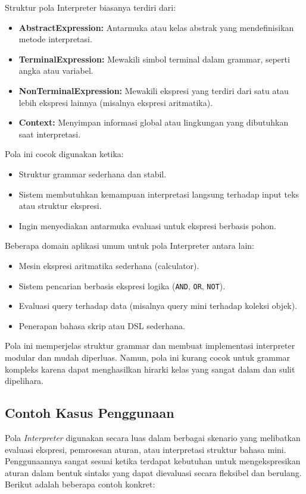 Struktur pola Interpreter biasanya terdiri dari:
\begin{itemize}
	\item \textbf{AbstractExpression:} Antarmuka atau kelas abstrak yang mendefinisikan metode interpretasi.
	\item \textbf{TerminalExpression:} Mewakili simbol terminal dalam grammar, seperti angka atau variabel.
	\item \textbf{NonTerminalExpression:} Mewakili ekspresi yang terdiri dari satu atau lebih ekspresi lainnya (misalnya ekspresi aritmatika).
	\item \textbf{Context:} Menyimpan informasi global atau lingkungan yang dibutuhkan saat interpretasi.
\end{itemize}

Pola ini cocok digunakan ketika:
\begin{itemize}
	\item Struktur grammar sederhana dan stabil.
	\item Sistem membutuhkan kemampuan interpretasi langsung terhadap input teks atau struktur ekspresi.
	\item Ingin menyediakan antarmuka evaluasi untuk ekspresi berbasis pohon.
\end{itemize}

Beberapa domain aplikasi umum untuk pola Interpreter antara lain:
\begin{itemize}
	\item Mesin ekspresi aritmatika sederhana (calculator).
	\item Sistem pencarian berbasis ekspresi logika (\texttt{AND}, \texttt{OR}, \texttt{NOT}).
	\item Evaluasi query terhadap data (misalnya query mini terhadap koleksi objek).
	\item Penerapan bahasa skrip atau DSL sederhana.
\end{itemize}

Pola ini memperjelas struktur grammar dan membuat implementasi interpreter modular dan mudah diperluas. Namun, pola ini kurang cocok untuk grammar kompleks karena dapat menghasilkan hirarki kelas yang sangat dalam dan sulit dipelihara.


\subsection{Contoh Kasus Penggunaan}

Pola \textit{Interpreter} digunakan secara luas dalam berbagai skenario yang melibatkan evaluasi ekspresi, pemrosesan aturan, atau interpretasi struktur bahasa mini. Penggunaannya sangat sesuai ketika terdapat kebutuhan untuk mengekspresikan aturan dalam bentuk sintaks yang dapat dievaluasi secara fleksibel dan berulang. Berikut adalah beberapa contoh konkret:

